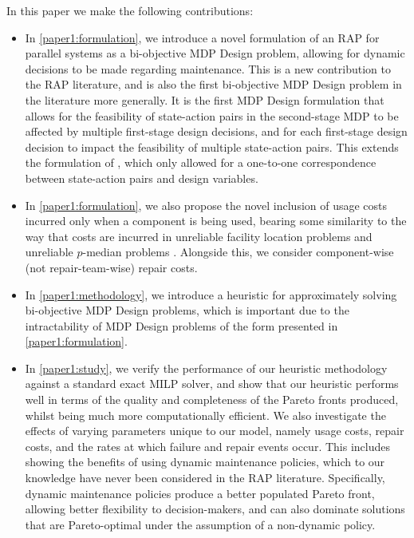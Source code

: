 \documentclass[11pt,authoryear,a4paper]{article}
\theoremstyle{definition}
\begin{document}
{In this paper we make the following contributions:
\begin{itemize}
    \item In \autoref{paper1:formulation}, we introduce a novel formulation of an RAP for parallel systems as a bi-objective MDP Design problem, allowing for dynamic decisions to be made regarding maintenance. This is a new contribution to the RAP literature, and is also the first bi-objective MDP Design problem in the literature more generally. It is the first MDP Design formulation that allows for the feasibility of state-action pairs in the second-stage MDP to be affected by multiple first-stage design decisions, and for each first-stage design decision to impact the feasibility of multiple state-action pairs. This extends the formulation of \cite{dimitrov2009mdpDesign}, which only allowed for a one-to-one correspondence between state-action pairs and design variables.
    \item In \autoref{paper1:formulation}, we also propose the novel inclusion of usage costs incurred only when a component is being used, bearing some similarity to the way that costs are incurred in unreliable facility location problems \citep{lim2010facility, lim2012facility} and unreliable $p$-median problems \citep{OHANLEY201363}. Alongside this, we consider component-wise (not repair-team-wise) repair costs.
    \item In \autoref{paper1:methodology}, we introduce a heuristic for approximately solving bi-objective MDP Design problems, which is important due to the intractability of MDP Design problems of the form presented in \autoref{paper1:formulation}.  
    \item In \autoref{paper1:study}, we verify the performance of our heuristic methodology against a standard exact MILP solver, and show that our heuristic performs well in terms of the quality and completeness of the Pareto fronts produced, whilst being much more computationally efficient. We also investigate the effects of varying parameters unique to our model, namely usage costs, repair costs, and the rates at which failure and repair events occur. This includes showing the benefits of using dynamic maintenance policies, which to our knowledge have never been considered in the RAP literature. Specifically, dynamic maintenance policies produce a better populated Pareto front, allowing better flexibility to decision-makers, and can also dominate solutions that are Pareto-optimal under the assumption of a non-dynamic policy.
\end{itemize}}
\end{document}
